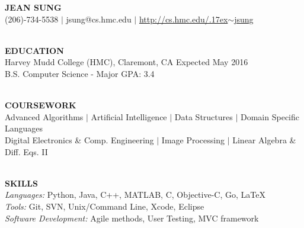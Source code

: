 \documentclass[11.5pt]{article}
\makeatletter
\newcommand{\selfName}{\textbf{\fontsize{30}{30}\selectfont JEAN SUNG }}
\newcommand{\addrA}{\small 340 E. Foothill Blvd, }
\newcommand{\addrB}{\small Claremont, CA 91711 }
\newcommand{\email}{\large {jsung@cs.hmc.edu }}
\newcommand{\phone}{\large (206)-734-5538 }
\newcommand{\tildeText}{\raise.17ex\hbox{$\scriptstyle\sim$}}
\newcommand{\websitedisplaytext}{\large http://cs.hmc.edu/\tildeText jsung }
\newcommand{\website}{\href{http://cs.hmc.edu/~jsung}{\websitedisplaytext}}
\newcommand{\wrapTitle}[1]{{\sectionNL \textbf{\Large #1}} \sectionNL}
\newcommand{\vb}{ $\mid$ }
\newcommand{\sectionNL}{~\\[1pt]}
\newcommand{\HMC}{HMC}
\newcommand{\rightAlign}{\hfill}
\makeatother
\begin{document}
\begin{center}
\selfName\\
\phone \vb 
\email \vb
\website

\hrulefill
\end{center}




\begin{flushleft}
\wrapTitle{EDUCATION}
Harvey Mudd College (\HMC), Claremont, CA \rightAlign Expected May 2016  \\
B.S. Computer Science - Major GPA: 3.4   \\
\end{flushleft}


\begin{flushleft}
\wrapTitle{COURSEWORK}
Advanced Algorithms 
\vb Artificial Intelligence 
\vb Data Structures 
\vb Domain Specific Languages\\
Digital Electronics \& Comp. Engineering
\vb Image Processing  
\vb Linear Algebra \& Diff. Eqs. II

\end{flushleft}


\begin{flushleft}
\wrapTitle{SKILLS}
\textit{Languages:} Python, Java, C++, MATLAB, C, Objective-C, Go, \LaTeX \\
\textit{Tools:} Git, SVN, Unix/Command Line, Xcode, Eclipse \\ %
\textit{Software Development:} Agile methods, User Testing, MVC framework

\end{flushleft}
\end{document}
